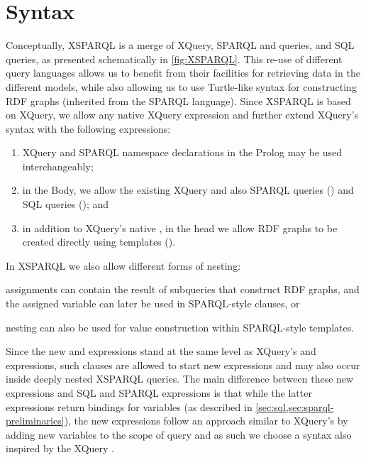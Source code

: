 \section{Syntax}
\label{sec:syntax}



%
Conceptually, XSPARQL is a merge of XQuery, SPARQL \CONSTRUCT and \SELECT queries, and \ac{SQL} \SELECT queries, as
presented schematically in \cref{fig:XSPARQL}.
%
This re-use of different query languages allows us to benefit from their facilities for retrieving data in the different
models, while also allowing us to use Turtle-like syntax for constructing RDF graphs (inherited from the SPARQL
language).
%
Since XSPARQL is based on XQuery, we allow any native XQuery expression and further extend XQuery's syntax with the following
expressions:
%
\begin{enumerate}[label=(\roman*),noitemsep]
\item XQuery and SPARQL namespace declarations in the Prolog may be used interchangeably;
\item in the Body, we allow the existing XQuery  and also
  SPARQL \SELECT queries (\SparqlForClause) and
  SQL \SELECT queries (\SQLForClause); and

\item in addition to XQuery's native \ReturnClause, in the head we allow RDF graphs to be created directly using
  \CONSTRUCT templates (\ConstructClause).
\end{enumerate}
%
In XSPARQL we also allow different forms of nesting:
%
\begin{inparaenum}[(i)]
\item \LET assignments can contain the result of subqueries that construct \ac{RDF} graphs, and the assigned variable
  can later be used in SPARQL-style \FROM clauses, or
\item nesting can also be used for value construction within SPARQL-style \CONSTRUCT templates.
\end{inparaenum}
%
Since the new \SQLForClause and \SparqlForClause expressions stand at the same level as XQuery's \FOR and \LET
expressions, such clauses are allowed to start new \synt{\XSPARQLFLWORExpr} expressions and may also occur inside deeply
nested XSPARQL queries.
%
The main difference between these new expressions and \ac{SQL} and SPARQL \SELECT expressions is that while the latter
expressions return bindings for variables (as described in \cref{sec:sql,sec:sparql-preliminaries}), the new expressions
follow an approach similar to XQuery's \ForClause by adding new variables to the scope of query and as such we choose a
syntax also inspired by the XQuery \ForClause.


